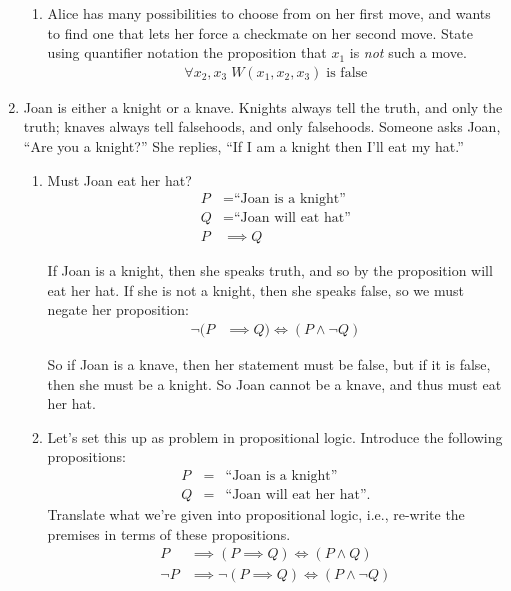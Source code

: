 \documentclass[11pt,fleqn]{article}
\begin{document}
\begin{enumerate}
\begin{enumerate}
\item Alice has many possibilities to choose from on her first move,
and wants to find one that lets her force a checkmate on her second move.
State using quantifier notation the proposition that $x_1$
is \emph{not} such a move.
\begin{align}
\forall x_2, x_3\; W(x_1, x_2, x_3)\;\text{is false}
\end{align}

\end{enumerate}

\item
Joan is either a knight or a knave.
Knights always tell the truth, and only the truth;
knaves always tell falsehoods, and only falsehoods.
Someone asks Joan, ``Are you a knight?''  She replies,
``If I am a knight then I'll eat my hat.''
\begin{enumerate}
\item Must Joan eat her hat?
\begin{align}
  P &= \text{``Joan is a knight''}\\
  Q &= \text{``Joan will eat hat''}\\
  P &\implies Q
\end{align}

If Joan is a knight, then she speaks truth, and so by the proposition will eat her hat.  If she is not a knight, then she speaks false, so we must negate her proposition:
\begin{align}
  \lnot (P &\implies Q) \iff (P \land \lnot Q)
\end{align}

So if Joan is a knave, then her statement must be false, but if it is false, then she must be a knight.  So Joan cannot be a knave, and thus must eat her hat.

\item Let's set this up as problem in propositional logic.
Introduce the following propositions:
\begin{eqnarray}
P &=& \text{``Joan is a knight''}\\
Q &=& \text{``Joan will eat her hat''}.
\end{eqnarray}
Translate what we're given into propositional logic,
i.e., re-write the premises in terms of these propositions.
\begin{align}
  P &\implies (P \implies Q) \iff (P \land Q)\\
  \lnot P &\implies \lnot (P \implies Q) \iff (P \land \lnot Q)
\end{align}


\end{enumerate}
\end{enumerate}
\end{document}
